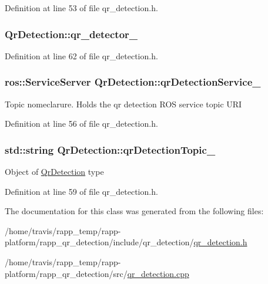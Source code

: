 Definition at line 53 of file qr\-\_\-detection.\-h.

\hypertarget{classQrDetection_a5417be9d21d01ff82067b022bfd613fe}{
\subsubsection[{qr\-\_\-detector\-\_\-}]{ Qr\-Detection\-::qr\-\_\-detector\-\_\-\hspace{0.3cm}{\ttfamily [private]}}}\label{classQrDetection_a5417be9d21d01ff82067b022bfd613fe}


Definition at line 62 of file qr\-\_\-detection.\-h.

\hypertarget{classQrDetection_a9785dc6824ccc757d5ba8c22d478b271}{
\subsubsection[{qr\-Detection\-Service\-\_\-}]{\setlength{\rightskip}{0pt plus 5cm}ros\-::\-Service\-Server Qr\-Detection\-::qr\-Detection\-Service\-\_\-\hspace{0.3cm}{\ttfamily [private]}}}\label{classQrDetection_a9785dc6824ccc757d5ba8c22d478b271}
Topic nomeclarure. Holds the qr detection R\-O\-S service topic U\-R\-I 

Definition at line 56 of file qr\-\_\-detection.\-h.

\hypertarget{classQrDetection_acbf716f43bb9af5cb95cd0289f07269d}{
\subsubsection[{qr\-Detection\-Topic\-\_\-}]{\setlength{\rightskip}{0pt plus 5cm}std\-::string Qr\-Detection\-::qr\-Detection\-Topic\-\_\-\hspace{0.3cm}{\ttfamily [private]}}}\label{classQrDetection_acbf716f43bb9af5cb95cd0289f07269d}
Object of \hyperlink{classQrDetection}{Qr\-Detection} type 

Definition at line 59 of file qr\-\_\-detection.\-h.



The documentation for this class was generated from the following files\-:\begin{DoxyCompactItemize}
\item 
/home/travis/rapp\-\_\-temp/rapp-\/platform/rapp\-\_\-qr\-\_\-detection/include/qr\-\_\-detection/\hyperlink{qr__detection_8h}{qr\-\_\-detection.\-h}\item 
/home/travis/rapp\-\_\-temp/rapp-\/platform/rapp\-\_\-qr\-\_\-detection/src/\hyperlink{qr__detection_8cpp}{qr\-\_\-detection.\-cpp}\end{DoxyCompactItemize}
